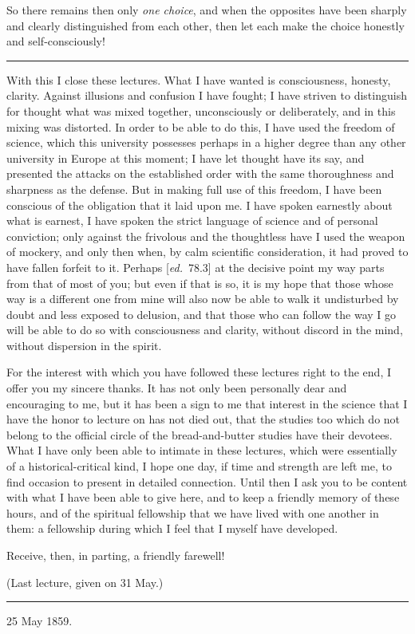 \documentclass[12pt,a4paper,openany]{book}
\newcommand{\kpage}[1]{\marginnote{\footnotesize\textit{[#1]}}}
\newcommand{\ed}[1]{{\small[\textit{ed.}\ #1]}}
\newcommand{\sepline}{\par\begin{center}\rule{2cm}{0.4pt}\end{center}\par}
\begin{document}
So there remains then only \emph{one choice}, and when the opposites
have been sharply and clearly distinguished from each other, then let each make the choice
honestly and self-consciously!

\sepline

With this I close these lectures. What I have wanted is consciousness,
honesty, clarity. Against illusions and confusion I have
fought; I have striven to distinguish for thought what was mixed together, unconsciously
or deliberately, and in this mixing was distorted.
In order to be able to do this, I have used the freedom of science\kpage{188},
which this university possesses perhaps in a higher
degree than any other university in Europe at this moment; I have
let thought have its say, and presented the attacks on the established order
with the same thoroughness and sharpness as the defense.
But in making full use of this freedom, I have
been conscious of the obligation that it laid upon me. I have
spoken earnestly about what is earnest, I have spoken the strict language of science and of
personal conviction; only against the frivolous
and the thoughtless have I used the weapon of mockery, and only then
when, by calm scientific consideration, it had proved to
have fallen forfeit to it. Perhaps \ed{78.3} at the decisive
point my way parts from that of most of you; but even if that is so, it is
my hope that those whose way is a different one from mine will also now be able to
walk it undisturbed by doubt and less exposed to delusion, and
that those who can follow the way I go will be able to do so with
consciousness and clarity, without discord in the mind, without dispersion in the
spirit.

For the interest with which you have followed these lectures right to the end,
I offer you my sincere thanks. It has
not only been personally dear and encouraging to me, but it has
been a sign to me that interest in the science that I have the
honor to lecture on has not died out, that the studies too which do not belong
to the official circle of the bread-and-butter studies have their devotees. What I have only
been able to intimate in these lectures, which were essentially of a historical-critical kind,
I hope one day, if time and strength are left me,
to find occasion to present in detailed connection.
Until then I ask you to be content with what I have been able to give here,
and to keep a friendly memory of these hours, and of the spiritual
fellowship that we have lived with one another in them: a fellowship during
which I feel that I myself have developed.

Receive, then, in parting, a friendly farewell!
\begin{flushright}(Last lecture, given on 31 May.)\end{flushright}

\sepline

25 May 1859.
\end{document}

